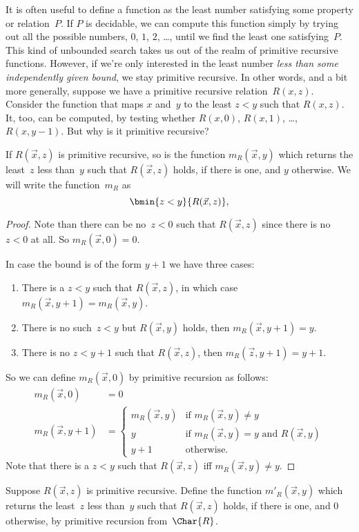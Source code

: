 \documentclass[../../../include/open-logic-section]{subfiles}
\begin{document}

\begin{explain}
It is often useful to define a function as the least number satisfying
some property or relation~$P$. If $P$ is decidable, we can compute
this function simply by trying out all the possible numbers, $0$, $1$,
$2$, \dots, until we find the least one satisfying~$P$.  This kind of
unbounded search takes us out of the realm of primitive recursive
functions. However, if we're only interested in the least number
\emph{less than some independently given bound}, we stay primitive
recursive. In other words, and a bit more generally, suppose we have a
primitive recursive relation~$R(x,z)$. Consider the function that maps
$x$ and~$y$ to the least $z < y$ such that $R(x, z)$. It, too, can be
computed, by testing whether $R(x, 0)$, $R(x, 1)$, \dots, $R(x, y-1)$.
But why is it primitive recursive?
\end{explain}

\begin{prop}
If $R(\vec x, z)$ is primitive recursive, so is the function
$m_R(\vec{x}, y)$ which returns the least~$z$ less than~$y$ such that
$R(\vec x, z)$ holds, if there is one, and $y$ otherwise.  We will
write the function~$m_R$ as
\[
\bmin{z < y}{R(\vec{x}, z)},
\]
\end{prop}

\begin{proof}
Note than there can be no~$z < 0$ such that $R(\vec{x}, z)$ since
there is no $z < 0$ at all.  So $m_R(\vec x, 0) = 0$.

In case the bound is of the form $y + 1$ we have three cases:
\begin{enumerate}
\item There is a $z < y$ such that $R(\vec{x}, z)$, in which case
$m_R(\vec{x}, y+1) = m_R(\vec{x}, y)$.
\item There is no such~$z<y$ but $R(\vec{x}, y)$ holds, then
$m_R(\vec{x}, y+1) = y$.
\item There is no $z < y+1$ such that $R(\vec{x}, z)$, then
$m_R(\vec{z}, y+1) = y+1$.
\end{enumerate}
So we can define $m_R(\vec x, 0)$ by primitive recursion as follows:
\begin{align*}
m_R(\vec{x}, 0) & = 0\\
m_R(\vec{x}, y+1) & =
\begin{cases}
m_R(\vec{x}, y) & \text{if $m_R(\vec x, y) \neq y$}\\
y & \text{if $m_R(\vec x, y) = y$ and $R(\vec{x}, y)$}\\
y+1 & \text{otherwise.}
\end{cases}
\end{align*}
Note that there is a $z<y$ such that $R(\vec x, z)$ iff $m_R(\vec x,
y) \neq y$.
\end{proof}

\begin{prob}
Suppose $R(\vec x, z)$ is primitive recursive. Define the function
$m'_R(\vec{x}, y)$ which returns the least~$z$ less than~$y$ such that
$R(\vec{x}, z)$ holds, if there is one, and $0$ otherwise, by
primitive recursion from~$\Char{R}$.
\end{prob}
\end{document}
